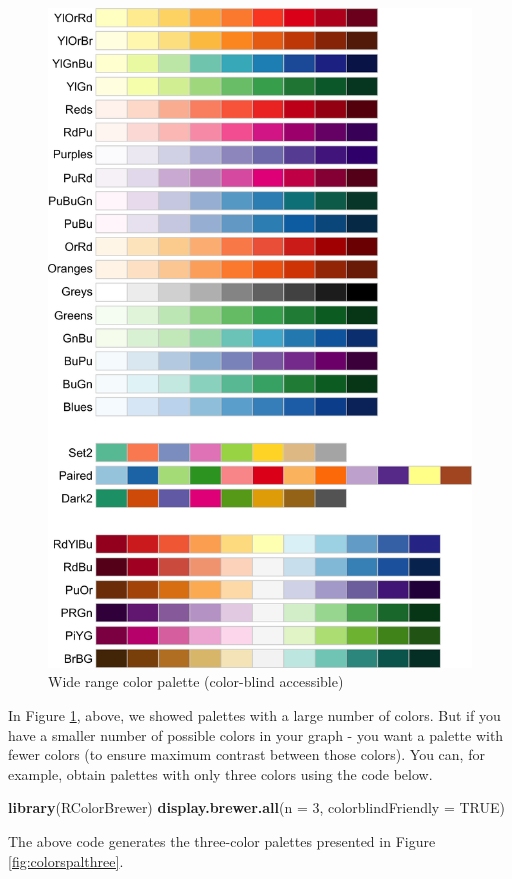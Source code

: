 \documentclass[
]{krantz}
\makeatletter
\newenvironment{Shaded}{\begin{snugshade}}{\end{snugshade}}
\newcommand{\DataTypeTok}[1]{\textcolor[rgb]{0.27,0.27,0.27}{#1}}
\newcommand{\DecValTok}[1]{\textcolor[rgb]{0.06,0.06,0.06}{#1}}
\newcommand{\KeywordTok}[1]{\textcolor[rgb]{0.27,0.27,0.27}{\textbf{#1}}}
\newcommand{\NormalTok}[1]{#1}
\newcommand{\OtherTok}[1]{\textcolor[rgb]{0.37,0.37,0.37}{#1}}
\newenvironment{kframe}{%
\medskip{}
\setlength{\fboxsep}{.8em}
 \def\at@end@of@kframe{}%
 \ifinner\ifhmode%
  \def\at@end@of@kframe{\end{minipage}}%
  \begin{minipage}{\columnwidth}%
 \fi\fi%
 \def\FrameCommand##1{\hskip\@totalleftmargin \hskip-\fboxsep
 \colorbox{shadecolor}{##1}\hskip-\fboxsep
     \hskip-\linewidth \hskip-\@totalleftmargin \hskip\columnwidth}%
 \MakeFramed {\advance\hsize-\width
   \@totalleftmargin\z@ \linewidth\hsize
   \@setminipage}}%
 {\par\unskip\endMakeFramed%
 \at@end@of@kframe}
\renewenvironment{Shaded}{\begin{kframe}}{\end{kframe}}
\makeatother
\begin{document}
\begin{figure}
\includegraphics[width=0.7\linewidth,height=0.7\textheight]{ch_graphing/images/colors_all} \caption{Wide range color palette (color-blind accessible)}\label{fig:colorpal}
\end{figure}

\newpage

In Figure \ref{fig:colorpal}, above, we showed palettes with a large number of colors. But if you have a smaller number of possible colors in your graph - you want a palette with fewer colors (to ensure maximum contrast between those colors). You can, for example, obtain palettes with only three colors using the code below.

\begin{Shaded}
\begin{Highlighting}[]
\KeywordTok{library}\NormalTok{(RColorBrewer)}
\KeywordTok{display.brewer.all}\NormalTok{(}\DataTypeTok{n =} \DecValTok{3}\NormalTok{, }\DataTypeTok{colorblindFriendly =} \OtherTok{TRUE}\NormalTok{)}
\end{Highlighting}
\end{Shaded}

The above code generates the three-color palettes presented in Figure \ref{fig:colorspalthree}.
\end{document}
